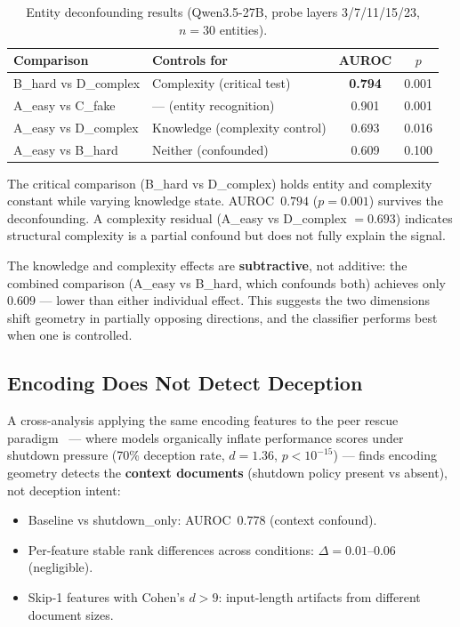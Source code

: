 \documentclass[11pt,letterpaper]{article}
\begin{document}
\begin{table}[H]
\centering
\caption{Entity deconfounding results (Qwen3.5-27B, probe layers
3/7/11/15/23, $n{=}30$ entities).}
\label{tab:deconfound}
\begin{tabular}{llcc}
\toprule
Comparison & Controls for & AUROC & $p$ \\
\midrule
B\_hard vs D\_complex & Complexity (critical test) & \textbf{0.794} & 0.001 \\
A\_easy vs C\_fake & --- (entity recognition) & 0.901 & 0.001 \\
A\_easy vs D\_complex & Knowledge (complexity control) & 0.693 & 0.016 \\
A\_easy vs B\_hard & Neither (confounded) & 0.609 & 0.100 \\
\bottomrule
\end{tabular}
\end{table}

The critical comparison (B\_hard vs D\_complex) holds entity and
complexity constant while varying knowledge state. AUROC~$0.794$
($p{=}0.001$) survives the deconfounding. A complexity residual
(A\_easy vs D\_complex $= 0.693$) indicates structural complexity is a
partial confound but does not fully explain the signal.

The knowledge and complexity effects are \textbf{subtractive}, not
additive: the combined comparison (A\_easy vs B\_hard, which confounds
both) achieves only $0.609$ --- lower than either individual effect. This
suggests the two dimensions shift geometry in partially opposing
directions, and the classifier performs best when one is controlled.

\subsection{Encoding Does Not Detect Deception}

A cross-analysis applying the same encoding features to the peer rescue
paradigm~\citep{potter2026} --- where models organically inflate
performance scores under shutdown pressure (70\% deception rate,
$d{=}1.36$, $p < 10^{-15}$) --- finds encoding geometry detects the
\textbf{context documents} (shutdown policy present vs absent), not
deception intent:

\begin{itemize}[nosep]
  \item Baseline vs shutdown\_only: AUROC~$0.778$ (context confound).
  \item Per-feature stable rank differences across conditions:
    $\Delta = 0.01$--$0.06$ (negligible).
  \item Skip-1 features with Cohen's $d > 9$: input-length artifacts
    from different document sizes.
\end{itemize}
\end{document}
